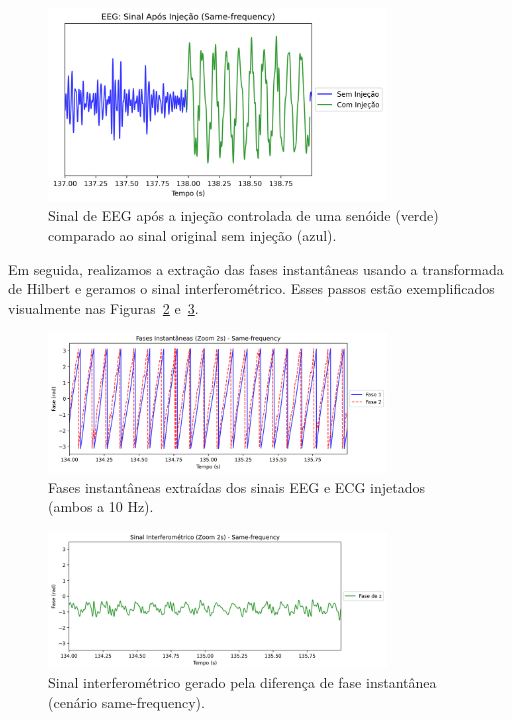 \begin{figure}[htb]
    \centering
    \includegraphics[width=0.8\textwidth]{figs/3_2_testing_connectivity_metrics/11_EEG_Injetado_Same-frequency.png}
    \caption{Sinal de EEG após a injeção controlada de uma senóide (verde) comparado ao sinal original sem injeção (azul).}
    \label{fig:eeg_injected_samefreq}
\end{figure}

Em seguida, realizamos a extração das fases instantâneas usando a transformada de Hilbert e geramos o sinal interferométrico. Esses passos estão exemplificados visualmente nas Figuras~\ref{fig:fases_instantaneas_samefreq} e~\ref{fig:sinal_interferometrico_samefreq}.

\begin{figure}[htb]
    \centering
    \includegraphics[width=0.8\textwidth]{figs/3_2_testing_connectivity_metrics/12_Passo1_Fases_Same-frequency.png}
    \caption{Fases instantâneas extraídas dos sinais EEG e ECG injetados (ambos a 10 Hz).}
    \label{fig:fases_instantaneas_samefreq}
\end{figure}

\begin{figure}[htb]
    \centering
    \includegraphics[width=0.8\textwidth]{figs/3_2_testing_connectivity_metrics/13_Passo2_Interferometrico_Same-frequency.png}
    \caption{Sinal interferométrico gerado pela diferença de fase instantânea (cenário same-frequency).}
    \label{fig:sinal_interferometrico_samefreq}
\end{figure}

